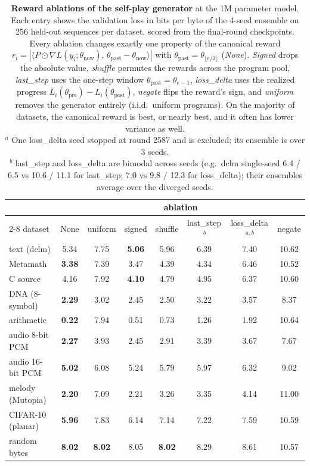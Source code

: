 
\begin{table}[t]
\centering
\small
\setlength{\tabcolsep}{4.5pt}
\begin{tabular}{lccccccc}
\toprule
 & \multicolumn{7}{c}{ablation} \\
\cmidrule(lr){2-8}
dataset & None & uniform & signed & shuffle & last\_step$^{\,b}$ & loss\_delta$^{\,a,b}$ & negate \\
\midrule
text (dclm)                 & 5.34 & 7.75 & \textbf{5.06} & 5.96 & 6.39 & 7.40 & 10.62 \\
Metamath                    & \textbf{3.38} & 7.39 & 3.47 & 4.39 & 4.34 & 6.46 & 10.52 \\
C source                    & 4.16 & 7.92 & \textbf{4.10} & 4.79 & 4.95 & 6.37 & 10.60 \\
DNA (8-symbol)              & \textbf{2.29} & 3.02 & 2.45 & 2.50 & 3.22 & 3.57 & 8.37 \\
arithmetic                  & \textbf{0.22} & 7.94 & 0.51 & 0.73 & 1.26 & 1.92 & 10.64 \\
audio 8-bit PCM             & \textbf{2.27} & 3.93 & 2.45 & 2.91 & 3.39 & 3.67 & 7.67 \\
audio 16-bit PCM            & \textbf{5.02} & 6.08 & 5.24 & 5.79 & 5.97 & 6.32 & 9.02 \\
melody (Mutopia)            & \textbf{2.20} & 7.09 & 2.21 & 3.26 & 3.35 & 4.14 & 11.00 \\
CIFAR-10 (planar)           & \textbf{5.96} & 7.83 & 6.14 & 7.14 & 7.22 & 7.59 & 10.59 \\
random bytes         & \textbf{8.02} & \textbf{8.02} & 8.05 & \textbf{8.02} & 8.29 & 8.61 & 10.57 \\
\bottomrule
\end{tabular}
\vspace{2em}
\caption{
\textbf{Reward ablations of the self-play generator} at the 1M parameter model. Each entry shows the validation loss in bits per byte of the 4-seed ensemble on 256 held-out sequences per dataset, scored from the final-round checkpoints. Every ablation changes exactly one property of the canonical reward $r_i = {|\langle P\odot\nabla L(y_i;\theta_{\text{now}}),\, \theta_{\text{past}}-\theta_{\text{now}}\rangle|}$ with $\theta_{\text{past}}=\theta_{\lfloor e/2\rfloor}$ (\emph{None}). \emph{Signed} drops the absolute value, \emph{shuffle} permutes the rewards across the program pool, \emph{last\_step} uses the one-step window $\theta_{\text{past}}=\theta_{e-1}$, \emph{loss\_delta} uses the realized progress $L_i(\theta_{\text{pre}})-L_i(\theta_{\text{post}})$, \emph{negate} flips the reward's sign, and \emph{uniform} removes the generator entirely (i.i.d.\ uniform programs). On the majority of datasets, the canonical reward is best, or nearly best, and it often has lower variance as well. \\
$^{a}$ One loss\_delta seed stopped at round 2587 and is excluded; its ensemble is over 3 seeds. \\
$^{b}$ last\_step and loss\_delta are bimodal across seeds (e.g.\ dclm single-seed 6.4 / 6.5 vs 10.6 / 11.1 for last\_step; 7.0 vs 9.8 / 12.3 for loss\_delta); their ensembles average over the diverged seeds.
}
\label{tab:reward_ablations}
\end{table}
